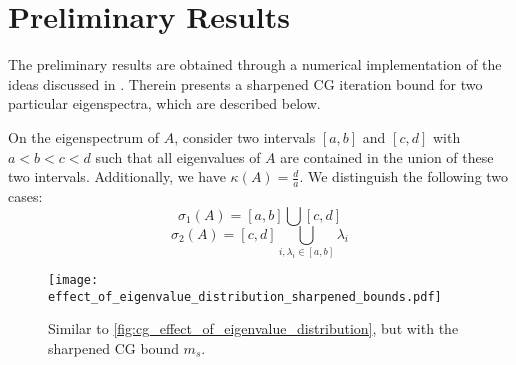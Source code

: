 \chapter{Preliminary Results}\label{ch:preliminary_results}\newpage
{}\newline
The preliminary results are obtained through a numerical implementation of the ideas discussed in \cite[Section 4]{cg_sharpened_convrate_Axelsson1976}. Therein \citeauthor{cg_sharpened_convrate_Axelsson1976} presents a sharpened CG iteration bound for two particular eigenspectra, which are described below.

On the eigenspectrum of $A$, consider two intervals $[a, b]$ and $[c, d]$ with $a < b < c < d$ such that all eigenvalues of $A$ are contained in the union of these two intervals. Additionally, we have $\kappa(A) = \frac{d}{a}$. We distinguish the following two cases:
\begin{equation}
    \sigma_1(A) = [a,b] \bigcup [c,d]
    \label{eq:two_clusters}
\end{equation}
\begin{equation}
    \sigma_2(A) = [c,d] \bigcup_{i, \lambda_i \in [a,b]} \lambda_i
    \label{eq:one_cluster_with_tail}
\end{equation}
\begin{figure}[H]
    \centering
    \texttt{[image: effect\_of\_eigenvalue\_distribution\_sharpened\_bounds.pdf]}
    \caption{Similar to \cref{fig:cg_effect_of_eigenvalue_distribution}, but with the sharpened CG bound $m_s$.}
    \label{fig:cg_sharpened_bound}
\end{figure}
\newline
{}\newline
{}\newline
{}\newline